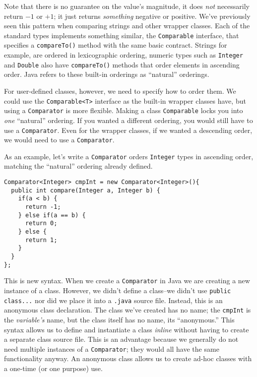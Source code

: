 Note that there is no guarantee on the value's magnitude, it does \emph{not}
necessarily return $-1$ or $+1$; it just returns \emph{something} negative or
positive.  We've previously seen this pattern when comparing strings and
other wrapper classes.  Each of the standard types implements something similar, 
the \texttt{Comparable} interface, that specifies a \texttt{compareTo()} method with the same basic contract.  Strings for example, are
ordered in lexicographic ordering, numeric types such as 
\texttt{Integer} and \texttt{Double} also have 
\texttt{compareTo()} methods that order elements in ascending order.
Java refers to these built-in orderings as ``natural'' orderings.  

For user-defined classes, however, we need to specify how to order them.  
We could use the \texttt{Comparable<T>} interface as the built-in
wrapper classes have, but using a \texttt{Comparator} is more 
flexible.  Making a class \texttt{Comparable} locks you into \emph{one}
``natural'' ordering.  If you wanted a different ordering, you would still have
to use a \texttt{Comparator}.  Even for the wrapper classes, if we
wanted a descending order, we would need to use a \texttt{Comparator}.

As an example, let's write a \texttt{Comparator} orders 
\texttt{Integer} types in ascending order, matching the
``natural'' ordering already defined.

\begin{verbatim}
Comparator<Integer> cmpInt = new Comparator<Integer>(){
  public int compare(Integer a, Integer b) {
    if(a < b) {
      return -1;
    } else if(a == b) {
      return 0;
    } else {
      return 1;
    }
  }
};
\end{verbatim}

This is new syntax.  When we create a \texttt{Comparator} in 
Java we are creating a new instance of a class.  However, we didn't define
a class--we didn't use \texttt{public class...} nor did we place
it into a \texttt{.java} source file.  Instead, this is an
\gls{anonymous class} declaration.  The class we've created has no name; 
the \texttt{cmpInt} is the \emph{variable's} name, but the
class itself has no name, its ``anonymous.''  This syntax allows us to
define and instantiate a class \emph{inline} without having to create a
separate class source file.  This is an advantage because we generally
do not need multiple instances of a \texttt{Comparator}; they
would all have the same functionality anyway.  An anonymous class allows
us to create ad-hoc classes with a one-time (or one purpose) use.

